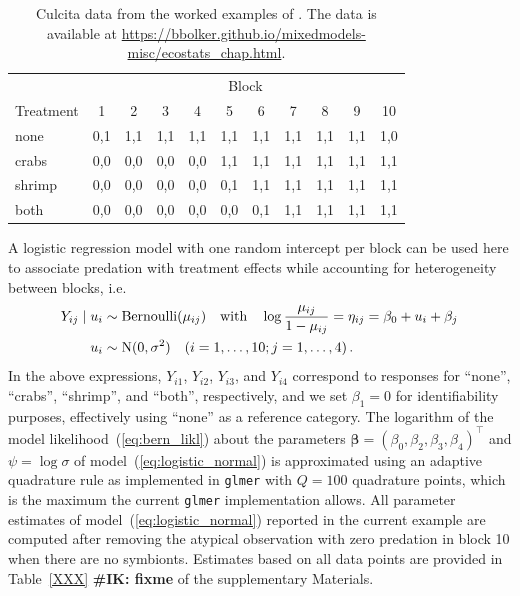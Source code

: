 \documentclass[11pt, a4paper]{article}
\newcommand*{\bb}{\boldsymbol}
\newcommand{\IK}[1]{{\noindent \color{blue} \bf \#IK: #1}}
\theoremstyle{example} \newtheorem{example}{Example}[section]
\theoremstyle{theorem} \newtheorem{theorem}{Theorem}[section]
\def\bbeta{\bb{\beta}}
\begin{document}
  \begin{table}[t]
    \caption{Culcita data \citep{mckeon+etal:2012} from the worked
      examples of \citet{bolker:2015}. The data is available at
      \url{https://bbolker.github.io/mixedmodels-misc/ecostats\_chap.html}.}
    \label{tab:culcita}
    \centering
    \begin{tabular}{lllllllllll}
      \toprule
      & \multicolumn{10}{c}{Block} \\ \cmidrule{2-11}
      \multicolumn{1}{c}{Treatment} & \multicolumn{1}{c}{1} & \multicolumn{1}{c}{2} & \multicolumn{1}{c}{3} & \multicolumn{1}{c}{4} & \multicolumn{1}{c}{5} & \multicolumn{1}{c}{6} & \multicolumn{1}{c}{7} & \multicolumn{1}{c}{8} & \multicolumn{1}{c}{9} & \multicolumn{1}{c}{10} \\
      \midrule
      none & 0,1 & 1,1 & 1,1 & 1,1 & 1,1 & 1,1 & 1,1 & 1,1 & 1,1 & 1,0 \\
      crabs & 0,0 & 0,0 & 0,0 & 0,0 & 1,1 & 1,1 & 1,1 & 1,1 & 1,1 & 1,1 \\
      shrimp & 0,0 & 0,0 & 0,0 & 0,0 & 0,1 & 1,1 & 1,1 & 1,1 & 1,1 & 1,1 \\
      both & 0,0 & 0,0 & 0,0 & 0,0 & 0,0 & 0,1 & 1,1 & 1,1 & 1,1 & 1,1 \\
      \bottomrule
    \end{tabular}
\end{table}

A logistic regression model with one random intercept per block can be
used here to associate predation with treatment effects while
accounting for heterogeneity between blocks, i.e.
\begin{align}
  \label{eq:logistic_normal}
  Y_{ij} \mid u_i & \sim \text{Bernoulli}(\mu_{ij}) \quad  \text{with} \quad
  \log{\frac{\mu_{ij}}{1 - \mu_{ij}}} =  \eta_{ij} =  \beta_0 + u_i + \beta_{j} \\ \notag
  u_i & \sim \text{N}(0, \sigma^2) \quad (i = 1, \ldots, 10; j = 1, \ldots, 4)\,.
\end{align}
In the above expressions, $Y_{i1}$, $Y_{i2}$, $Y_{i3}$, and $Y_{i4}$
correspond to responses for ``none'', ``crabs'',
``shrimp'', and ``both'', respectively, and we set $\beta_1 = 0$ for
identifiability purposes, effectively using ``none'' as a reference
category. The logarithm of the model likelihood~(\ref{eq:bern_likl})
about the parameters
$\bbeta = (\beta_0, \beta_2, \beta_3, \beta_4)^\top$ and
$\psi = \log\sigma$ of model~(\ref{eq:logistic_normal}) is
approximated using an adaptive quadrature rule \citep[see, for
example,][]{liu+pierce:1994, pinheiro+bates:1995} as implemented in
\texttt{glmer} with $Q = 100$ quadrature points, which is the maximum
the current \texttt{glmer} implementation allows. All parameter
estimates of model~(\ref{eq:logistic_normal}) reported in the current
example are computed after removing the atypical observation with zero
predation in block 10 when there are no symbionts. Estimates based on
all data points are provided in Table~\ref{XXX} \IK{fixme} of
the supplementary Materials.
\end{document}
